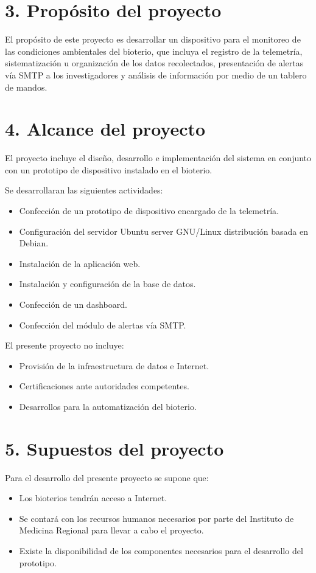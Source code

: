 \documentclass[
11pt, %
]{charter}
\begin{document}
\section{3. Propósito del proyecto}
\label{sec:proposito}
El propósito de este proyecto es desarrollar un dispositivo para el monitoreo de las condiciones ambientales del bioterio, que incluya el registro de la telemetría, sistematización u organización de los datos recolectados, presentación de alertas vía SMTP a los investigadores y análisis de información por medio de un tablero de mandos.

\section{4. Alcance del proyecto}
\label{sec:alcance}

El proyecto incluye el diseño, desarrollo e implementación del sistema en conjunto con un prototipo de dispositivo instalado en el bioterio.

Se desarrollaran las siguientes actividades:
\begin{itemize}
	\item Confección de un prototipo de dispositivo encargado de la telemetría.
	\item Configuración del servidor Ubuntu server GNU/Linux distribución basada en Debian.
	\item Instalación de la aplicación web.
	\item Instalación y configuración de la base de datos.
	\item Confección de un dashboard.
	\item Confección del módulo de alertas vía SMTP.
\end{itemize}


El presente proyecto no incluye:
\begin{itemize}
	\item Provisión de la infraestructura de datos e Internet.
	\item Certificaciones ante autoridades competentes.
	\item Desarrollos para la automatización del bioterio.
\end{itemize}

\section{5. Supuestos del proyecto}
\label{sec:supuestos}

Para el desarrollo del presente proyecto se supone que:
\begin{itemize}
	\item Los bioterios tendrán acceso a Internet.
	\item Se contará con los recursos humanos necesarios por parte del Instituto de Medicina Regional para llevar a cabo el proyecto.
	\item Existe la disponibilidad de los componentes necesarios para el desarrollo del prototipo.
\end{itemize}
\end{document}
